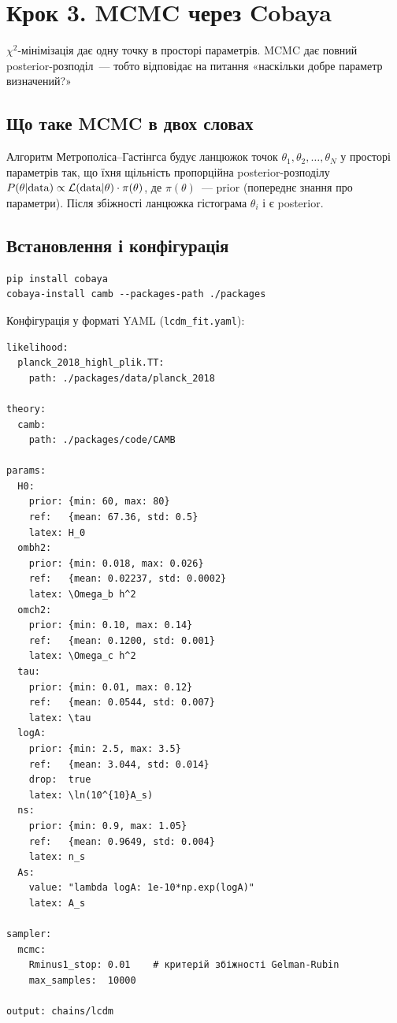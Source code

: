 \section{Крок 3. MCMC через Cobaya}

$\chi^2$-мінімізація дає одну точку в просторі параметрів.
MCMC дає повний posterior-розподіл~--- тобто відповідає
на питання «наскільки добре параметр визначений?»

\subsection{Що таке MCMC в двох словах}

Алгоритм Метрополіса--Гастінгса будує ланцюжок точок
$\theta_1, \theta_2, \ldots, \theta_N$ у просторі параметрів
так, що їхня щільність пропорційна posterior-розподілу
$P(\theta | {\rm data}) \propto \mathcal{L}({\rm data}|\theta)
\cdot \pi(\theta)$, де $\pi(\theta)$~--- prior (попереднє
знання про параметри). Після збіжності ланцюжка гістограма
$\theta_i$ і є posterior.

\subsection{Встановлення і конфігурація}

\begin{verbatim}
pip install cobaya
cobaya-install camb --packages-path ./packages
\end{verbatim}

Конфігурація у форматі YAML (\texttt{lcdm\_fit.yaml}):

\begin{verbatim}
likelihood:
  planck_2018_highl_plik.TT:
    path: ./packages/data/planck_2018

theory:
  camb:
    path: ./packages/code/CAMB

params:
  H0:
    prior: {min: 60, max: 80}
    ref:   {mean: 67.36, std: 0.5}
    latex: H_0
  ombh2:
    prior: {min: 0.018, max: 0.026}
    ref:   {mean: 0.02237, std: 0.0002}
    latex: \Omega_b h^2
  omch2:
    prior: {min: 0.10, max: 0.14}
    ref:   {mean: 0.1200, std: 0.001}
    latex: \Omega_c h^2
  tau:
    prior: {min: 0.01, max: 0.12}
    ref:   {mean: 0.0544, std: 0.007}
    latex: \tau
  logA:
    prior: {min: 2.5, max: 3.5}
    ref:   {mean: 3.044, std: 0.014}
    drop:  true
    latex: \ln(10^{10}A_s)
  ns:
    prior: {min: 0.9, max: 1.05}
    ref:   {mean: 0.9649, std: 0.004}
    latex: n_s
  As:
    value: "lambda logA: 1e-10*np.exp(logA)"
    latex: A_s

sampler:
  mcmc:
    Rminus1_stop: 0.01    # критерій збіжності Gelman-Rubin
    max_samples:  10000

output: chains/lcdm
\end{verbatim}

